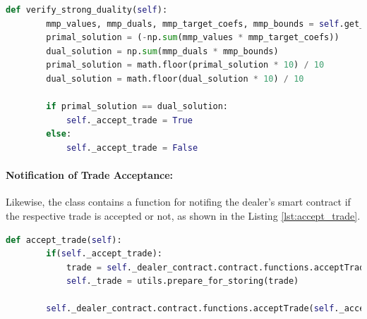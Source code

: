 \begin{lstlisting}[float=htbp, label=lst:verify_trade, caption=Agent Trade Verification, language=Python]
    def verify_strong_duality(self):
        mmp_values, mmp_duals, mmp_target_coefs, mmp_bounds = self.get_mmp_attributes()
        primal_solution = (-np.sum(mmp_values * mmp_target_coefs))
        dual_solution = np.sum(mmp_duals * mmp_bounds)
        primal_solution = math.floor(primal_solution * 10) / 10
        dual_solution = math.floor(dual_solution * 10) / 10

        if primal_solution == dual_solution:
            self._accept_trade = True
        else:
            self._accept_trade = False
\end{lstlisting}


\paragraph{Notification of Trade Acceptance:} Likewise, the class contains a function for notifing the dealer's smart contract if the respective trade is accepted or not,
as shown in the Listing \ref{lst:accept_trade}.

\begin{lstlisting}[float=htbp, label=lst:accept_trade, caption=Notification of Trade Acceptance, language=Python]
    def accept_trade(self):
        if(self._accept_trade):
            trade = self._dealer_contract.contract.functions.acceptTrade(self._accept_trade).call({'from': self._account_address})
            self._trade = utils.prepare_for_storing(trade)

        self._dealer_contract.contract.functions.acceptTrade(self._accept_trade).transact({'from': self._account_address})

\end{lstlisting}

